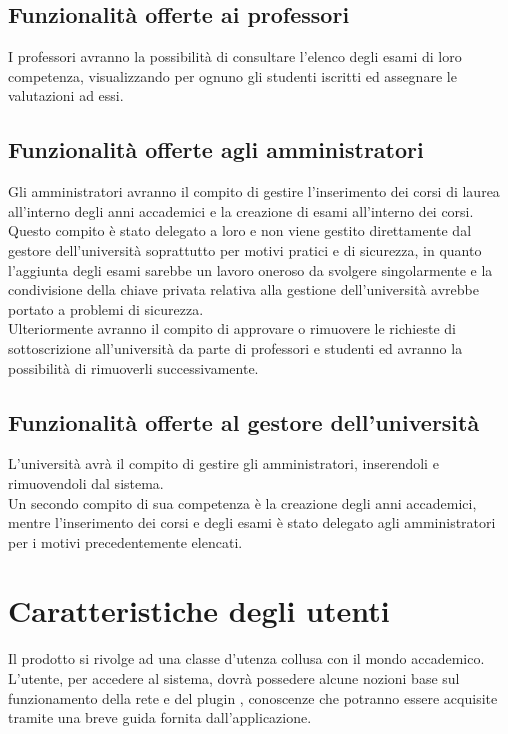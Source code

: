 \documentclass[AnalisiDeiRequisiti.tex]{subfiles}
\begin{document}
\subsection{Funzionalità offerte ai professori}
I professori avranno la possibilità di consultare l'elenco degli esami di loro competenza, visualizzando per ognuno gli studenti iscritti ed assegnare le valutazioni ad essi.

\subsection{Funzionalità offerte agli amministratori}
Gli amministratori avranno il compito di gestire l'inserimento dei corsi di laurea all'interno degli anni accademici e la creazione di esami all'interno dei corsi.\\
Questo compito è stato delegato a loro e non viene gestito direttamente dal gestore dell'università soprattutto per motivi pratici e di sicurezza, in quanto l'aggiunta degli esami sarebbe un lavoro oneroso da svolgere singolarmente e la condivisione della chiave privata relativa alla gestione dell'università avrebbe portato a problemi di sicurezza.\\
Ulteriormente avranno il compito di approvare o rimuovere le richieste di sottoscrizione all'università da parte di professori e studenti ed avranno la possibilità di rimuoverli successivamente.


\subsection{Funzionalità offerte al gestore dell'università}
L'università avrà il compito di gestire gli amministratori, inserendoli e rimuovendoli dal sistema.\\
Un secondo compito di sua competenza è la creazione degli anni accademici, mentre l'inserimento dei corsi e degli esami è stato delegato agli amministratori per i motivi precedentemente elencati.

\section{Caratteristiche degli utenti}
Il prodotto si rivolge ad una classe d'utenza collusa con il mondo accademico.\\
L'utente, per accedere al sistema, dovrà possedere alcune nozioni base sul funzionamento della rete  e del plugin , conoscenze che potranno essere acquisite tramite una breve guida fornita dall'applicazione.
\end{document}
